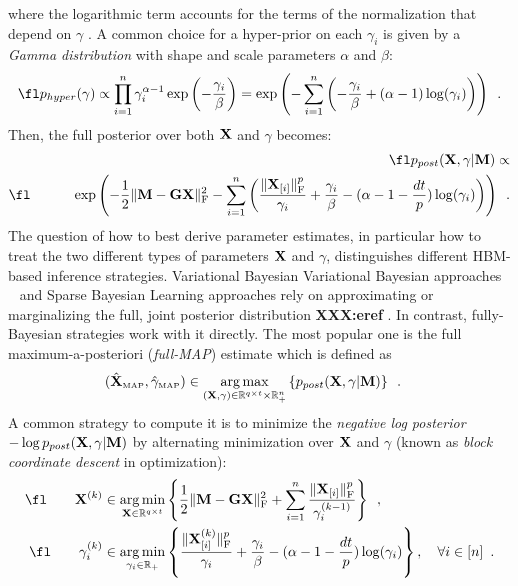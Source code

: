 where the logarithmic term accounts for the terms of the normalization that depend on $\gamma$ \cite{Lu14}. A common choice for a hyper-prior on each $\gamma_i$ is given by a \emph{Gamma distribution} \cite{mackay2003information,KaSo05,CaHaPuSo09,Lucka-etal:2012} with shape and scale parameters $\alpha$ and $\beta$:
\begin{equation} \label{eq:hyper}
\fl \hyper \propto
\prod_{i=1}^n \gamma_i^{\alpha - 1}
\exp \left(- \frac{\gamma_i}{\beta} \right)
=\exp \left( - \sum_{i=1}^n \left( - \frac{\gamma_i}{\beta} + (\alpha - 1) \log(\gamma_i) \right) \right) \enspace.
\end{equation}
Then, the full posterior over both $\mathbf{X}$ and $\gamma$ becomes:
\begin{eqnarray}
\label{eq:full-post}
\fl \hipost \propto \nonumber \\
\fl \hspace{3em} \exp \left( - \frac{1}{2} \fronormsq{\bfM - \bfG \bfX} - \sum_{i=1}^n \left( \frac{\fronorm{\bfX_{[i]}}^p}{\gamma_i} + \frac{\gamma_i}{\beta} - (\alpha - 1 - \frac{dt}{p}) \log(\gamma_i) \right) \right)\enspace.
\end{eqnarray}
The question of how to best derive parameter estimates, in particular how to treat the two different types of parameters $\mathbf{X}$ and $\gamma$, distinguishes different HBM-based inference strategies. Variational Bayesian Variational Bayesian approaches ~\cite{mackay2003information,jordan1999introduction,sato2004hierarchical,FrHaDaKiPhTrHeFlMa08,shervashidze2015learning} and Sparse Bayesian Learning \cite{tipping2001sparse,wipf2004sparse,Wipf-Nagarajan:2009,zhang-rao:2011} approaches rely on approximating or marginalizing the full, joint posterior distribution \textbf{XXX:eref}%
. In contrast, fully-Bayesian strategies \cite{CaHaPuSo09,Lucka-etal:2012} work with it directly. The most popular one is the full maximum-a-posteriori (\emph{full-MAP}) estimate which is defined as
\begin{eqnarray}
(\xMAP,\gamMAP) & \in \argmax_{(\bfX,\gamma) \in\R^{q \times t} \times \R^{n}_+} \left\lbrace \hipost \right\rbrace \enspace.%
\end{eqnarray}
A common strategy  to compute it is to minimize the \emph{negative log posterior} $-\log p_{post}(\mathbf{X},\gamma|\mathbf{M})$ by alternating  minimization over $\mathbf{X}$ and $\gamma$ (known as \emph{block coordinate descent} in optimization):
\begin{eqnarray}
\label{eq:AO}
\fl \qquad  \bfX^{(k)}& \in \argmin_{\bfX\in\R^{q \times t}} \left\lbrace \frac{1}{2} \fronormsq{\bfM - \bfG \bfX} + \sum_{i=1}^n  \frac{\fronorm{\bfX_{[i]}}^p}{\gamma^{(k-1)}_i} \right\rbrace \label{eq:AO-X}\enspace, \\
\fl \qquad \gamma^{(k)}_i & \in \argmin_{\gamma_i\in \R_+} \left\lbrace\frac{\fronorm{\bfX^{(k)}_{[i]}}^p }{\gamma_i} + \frac{\gamma_i}{\beta} - (\alpha - 1 - \frac{dt}{p}) \log(\gamma_i) \right\rbrace, \quad \forall i\in [n] \enspace. \label{eq:AO-gamma}
\end{eqnarray}
